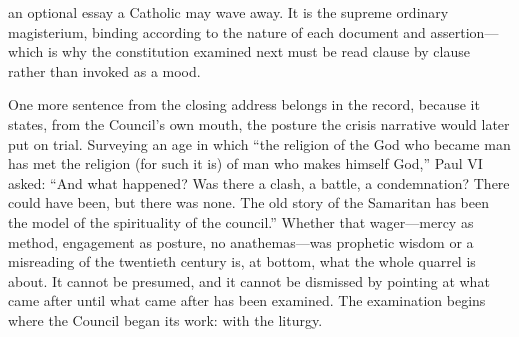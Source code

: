 an optional essay a Catholic may wave away. It is the supreme ordinary magisterium, binding according to the nature of each document and assertion---which is why the constitution examined next must be read clause by clause rather than invoked as a mood.

One more sentence from the closing address belongs in the record, because it states, from the Council's own mouth, the posture the crisis narrative would later put on trial. Surveying an age in which ``the religion of the God who became man has met the religion (for such it is) of man who makes himself God,'' Paul VI asked: ``And what happened? Was there a clash, a battle, a condemnation? There could have been, but there was none. The old story of the Samaritan has been the model of the spirituality of the council.'' Whether that wager---mercy as method, engagement as posture, no anathemas---was prophetic wisdom or a misreading of the twentieth century is, at bottom, what the whole quarrel is about. It cannot be presumed, and it cannot be dismissed by pointing at what came after until what came after has been examined. The examination begins where the Council began its work: with the liturgy.
